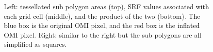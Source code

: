 \documentclass[hidelinks,12pt]{article}
\begin{document}
\begin{figure}[hbtp]
 \centering
 \quad \quad
{}  \caption{Left: tessellated sub polygon areas (top), SRF values associated with each grid cell (middle), and the product of the two (bottom). The blue box is the original OMI pixel, and the red box is the inflated OMI pixel. Right: similar to the right but the sub polygons are all simplified as squares.}
    \label{fig4}
\end{figure}
\end{document}
